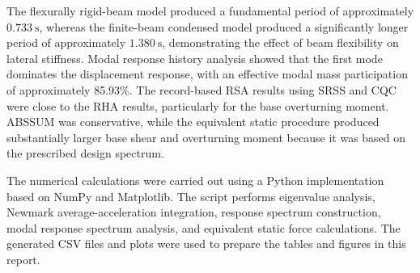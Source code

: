 \documentclass[11pt,a4paper]{article}
\begin{document}
The flexurally rigid-beam model produced a fundamental period of approximately $0.733\ \mathrm{s}$, whereas the finite-beam condensed model produced a significantly longer period of approximately $1.380\ \mathrm{s}$, demonstrating the effect of beam flexibility on lateral stiffness. Modal response history analysis showed that the first mode dominates the displacement response, with an effective modal mass participation of approximately 85.93\%. The record-based RSA results using SRSS and CQC were close to the RHA results, particularly for the base overturning moment. ABSSUM was conservative, while the equivalent static procedure produced substantially larger base shear and overturning moment because it was based on the prescribed design spectrum.

The numerical calculations were carried out using a Python implementation based on NumPy and Matplotlib. The script performs eigenvalue analysis, Newmark average-acceleration integration, response spectrum construction, modal response spectrum analysis, and equivalent static force calculations. The generated CSV files and plots were used to prepare the tables and figures in this report.
\end{document}
